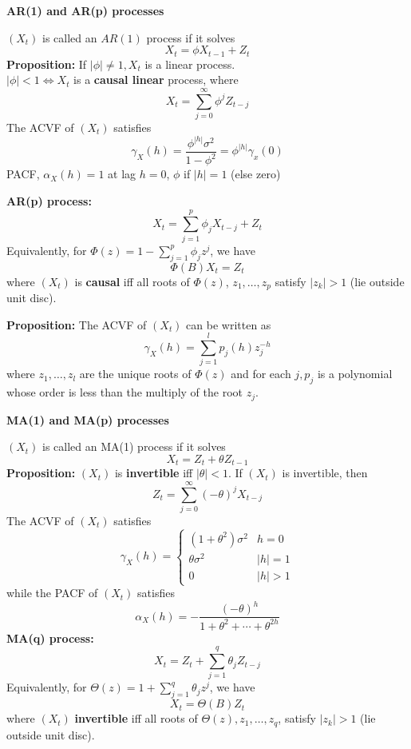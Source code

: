\documentclass[a4paper]{article}
\newcommand{\subheading}[1]{{\scriptsize\textbf{#1}}}
\begin{document}
\begin{multicols*}{4}
\smallskip
\hline
\smallskip

\subheading{AR(1) and AR(p) processes}

$\left(X_{t}\right)$ is called an $AR(1)$ process if it solves
$$
X_{t}=\phi X_{t-1}+Z_{t}
$$
\textbf{Proposition:} If $|\phi| \neq 1, X_{t}$ is a linear process. \\$|\phi|<1 \iff X_{t}$ is a \textbf{causal linear} process, where
$$
X_{t}=\sum_{j=0}^{\infty} \phi^{j} Z_{t-j}
$$
The ACVF of $\left(X_{t}\right)$ satisfies
$$
\gamma_{X}(h)=\frac{\phi^{|h|} \sigma^{2}}{1-\phi^{2}} = \phi^{|h|}\gamma_x(0)
$$
PACF, $\alpha_{X}(h) = 1$ at lag $h=0$, $\phi$ if $|h| = 1$ (else zero)

\subheading{AR(p) process:}
$$
X_{t}=\sum_{j=1}^{p} \phi_{j} X_{t-j}+Z_{t}
$$
Equivalently, for $\Phi(z)=1-\sum_{j=1}^{p} \phi_{j} z^{j}$, we have
$$
\Phi(B) X_{t}=Z_{t}
$$
where $\left(X_{t}\right)$ is \textbf{causal} iff all roots of $\Phi(z)$, $z_{1}, \ldots, z_{p}$ satisfy $\left|z_{k}\right|>1$ (lie outside unit disc).

\textbf{Proposition:} The ACVF of $\left(X_{t}\right)$ can be written as
$$
\gamma_{X}(h)=\sum_{j=1}^{l} p_{j}(h) z_{j}^{-h}
$$
where $z_{1}, \ldots, z_{l}$ are the unique roots of $\Phi(z)$ and for each $j, p_{j}$ is a polynomial whose order is less than the multiply of the root $z_{j}$. 

\smallskip
\hline
\smallskip

\subheading{MA(1) and MA(p) processes}

$\left(X_{t}\right)$ is called an MA(1) process if it solves
$$
X_{t}=Z_{t}+\theta Z_{t-1}
$$
\textbf{Proposition:} $\left(X_{t}\right)$ is \textbf{invertible} iff $|\theta|<1$. If $\left(X_{t}\right)$ is invertible, then
$$
Z_{t}=\sum_{j=0}^{\infty}(-\theta)^{j} X_{t-j}
$$
The ACVF of $\left(X_{t}\right)$ satisfies
$$
\gamma_{X}(h)= \begin{cases}\left(1+\theta^{2}\right) \sigma^{2} & h=0 \\ \theta \sigma^{2} & |h|=1 \\ 0 & |h|>1\end{cases}
$$
while the PACF of $\left(X_{t}\right)$ satisfies
$$
\alpha_{X}(h)=-\frac{(-\theta)^{h}}{1+\theta^{2}+\cdots+\theta^{2 h}}
$$
\subheading{MA(q) process:}
$$
X_{t}=Z_{t}+\sum_{j=1}^{q} \theta_{j} Z_{t-j}
$$
Equivalently, for $\Theta(z)=1+\sum_{j=1}^{q} \theta_{j} z^{j}$, we have
$$
X_{t}=\Theta(B) Z_{t}
$$
where $\left(X_{t}\right)$ \textbf{invertible} iff all roots of $\Theta(z), z_{1}, \ldots, z_{q}$, satisfy $\left|z_{k}\right|>1$ (lie outside unit disc).


\end{multicols*}
\end{document}
